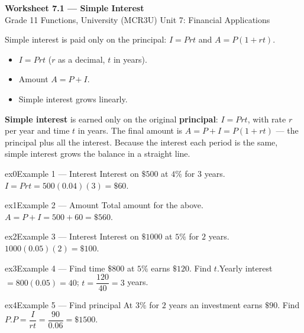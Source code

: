 \documentclass[11pt]{article}
\begin{document}
\begin{center}
{\LARGE\bfseries\color{titleblue}Worksheet 7.1 --- Simple Interest}\\[2pt]
{\small Grade 11 Functions, University (MCR3U) \textperiodcentered{} Unit 7: Financial Applications}
\end{center}

\begin{ideabox}
Simple interest is paid only on the principal: $I=Prt$ and $A=P(1+rt)$.
\begin{itemize}[leftmargin=*,itemsep=2pt]
  \item $I=Prt$ ($r$ as a decimal, $t$ in years).
  \item Amount $A=P+I$.
  \item Simple interest grows linearly.
\end{itemize}
\end{ideabox}

\begin{learnbox}
\textbf{Simple interest} is earned only on the original \textbf{principal}: $I=Prt$, with rate $r$ per year and time $t$ in years.
The final amount is $A=P+I=P(1+rt)$ — the principal plus all the interest.
Because the interest each period is the same, simple interest grows the balance in a straight line.
\end{learnbox}


\begin{example}{ex0}{Example 1 --- Interest}
Interest on $\$500$ at $4\%$ for $3$ years.\soln $I=Prt=500(0.04)(3)=\$60$.
\end{example}

\begin{example}{ex1}{Example 2 --- Amount}
Total amount for the above.\soln $A=P+I=500+60=\$560$.
\end{example}

\begin{example}{ex2}{Example 3 --- Interest}
Interest on $\$1000$ at $5\%$ for $2$ years.\soln $1000(0.05)(2)=\$100$.
\end{example}

\begin{example}{ex3}{Example 4 --- Find time}
$\$800$ at $5\%$ earns $\$120$. Find $t$.\soln Yearly interest $=800(0.05)=40$; $t=\dfrac{120}{40}=3$ years.
\end{example}

\begin{example}{ex4}{Example 5 --- Find principal}
At $3\%$ for $2$ years an investment earns $\$90$. Find $P$.\soln $P=\dfrac{I}{rt}=\dfrac{90}{0.06}=\$1500$.
\end{example}
\end{document}
